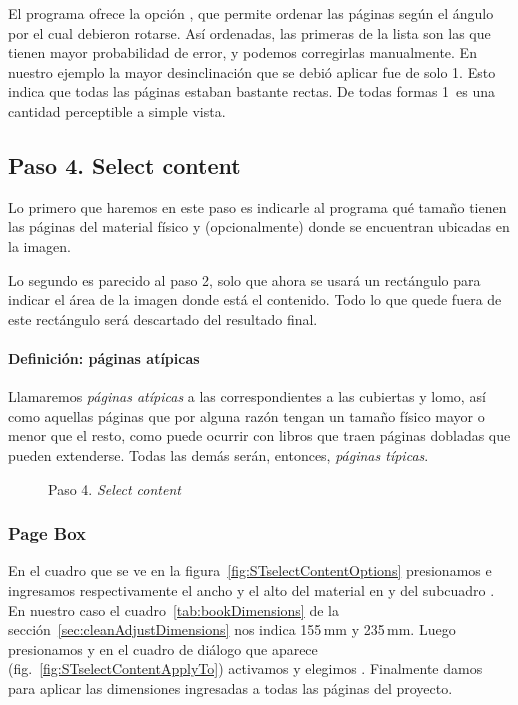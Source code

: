 \documentclass[%
	a5paper,
	10pt,
	twoside,
	openright,
	final,
]{memoir}
\begin{document}
{	El programa ofrece la opción , que permite ordenar las páginas según el ángulo por el cual debieron rotarse. Así ordenadas, las primeras de la lista son las que tienen mayor probabilidad de error, y podemos corregirlas manualmente. En nuestro ejemplo la mayor desinclinación que se debió aplicar fue de solo 1\textdegree. Esto indica que todas las páginas estaban bastante rectas. De todas formas 1\textdegree\ es una cantidad perceptible a simple vista.

	\subsection{Paso 4. Select content\label{sec:STselectContent}} Lo primero que haremos en este paso es indicarle al programa qué tamaño tienen las páginas del material físico y (opcionalmente) donde se encuentran ubicadas en la imagen.

	Lo segundo es parecido al paso 2, solo que ahora se usará un rectángulo para indicar el área de la imagen donde está el contenido. Todo lo que quede fuera de este rectángulo será descartado del resultado final.

	\paragraph{Definición: páginas atípicas} Llamaremos \emph{páginas atípicas} a las correspondientes a las cubiertas y lomo, así como aquellas páginas que por alguna razón tengan un tamaño físico mayor o menor que el resto, como puede ocurrir con libros que traen páginas dobladas que pueden extenderse. Todas las demás serán, entonces, \emph{páginas típicas}.

	\begin{figure}
		\centering
		\hfill
		\caption{Paso 4. \emph{Select content}\label{fig:STselectContent}}
	\end{figure}

	\subsubsection{Page Box} En el cuadro  que se ve en la figura~\ref{fig:STselectContentOptions} presionamos  e ingresamos respectivamente el ancho y el alto del material en  y  del subcuadro . En nuestro caso el cuadro~\ref{tab:bookDimensions} de la sección~\ref{sec:cleanAdjustDimensions} nos indica 155\,mm y 235\,mm. Luego presionamos  y en el cuadro de diálogo que aparece (fig.~\ref{fig:STselectContentApplyTo}) activamos  y elegimos . Finalmente damos  para aplicar las dimensiones ingresadas a todas las páginas del proyecto.

}
\end{document}
